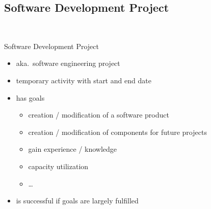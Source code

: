\subsection{Software Development Project}
\begin{frame}{\insertsubsection\ \mytitlesource{\ludewiglichter}}
	\begin{fancycolumns}
		\begin{definition}{Software Development Project}
			\begin{itemize}
				\item aka.\ software engineering project
				\item temporary activity with start and end date
				\item has goals
				\begin{itemize}
					\item creation / modification of a software product
					\item creation / modification of components for future projects
					\item gain experience / knowledge
					\item capacity utilization 
					\item \ldots
				\end{itemize}
				\item is successful if goals are largely fulfilled
			\end{itemize}
		\end{definition}
	\end{fancycolumns}
\end{frame}

